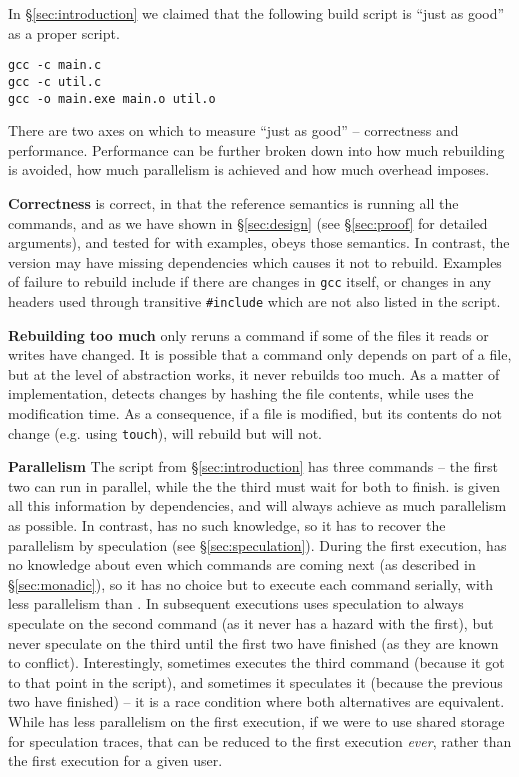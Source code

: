 In \S\ref{sec:introduction} we claimed that the following build script is ``just as good'' as a proper \Make script.

\begin{small}
\begin{verbatim}
gcc -c main.c
gcc -c util.c
gcc -o main.exe main.o util.o
\end{verbatim}
\end{small}

There are two axes on which to measure ``just as good'' -- correctness and performance. Performance can be further broken down into how much rebuilding is avoided, how much parallelism is achieved and how much overhead \Rattle imposes.

\textbf{Correctness} \Rattle is correct, in that the reference semantics is running all the commands, and as we have shown in \S\ref{sec:design} (see  \S\ref{sec:proof} for detailed arguments), and tested for with examples, \Rattle obeys those semantics. In contrast, the \Make version may have missing dependencies which causes it not to rebuild. Examples of failure to rebuild include if there are changes in \texttt{gcc} itself, or changes in any headers used through transitive \texttt{\#include} which are not also listed in the \Make script.

\textbf{Rebuilding too much} \Rattle only reruns a command if some of the files it reads or writes have changed. It is possible that a command only depends on part of a file, but at the level of abstraction \Rattle works, it never rebuilds too much. As a matter of implementation, \Rattle detects changes by hashing the file contents, while \Make uses the modification time. As a consequence, if a file is modified, but its contents do not change (e.g. using \texttt{touch}), \Make will rebuild but \Rattle will not.

\textbf{Parallelism} The script from \S\ref{sec:introduction} has three commands -- the first two can run in parallel, while the the third must wait for both to finish. \Make is given all this information by dependencies, and will always achieve as much parallelism as possible. In contrast, \Rattle has no such knowledge, so it has to recover the parallelism by speculation (see \S\ref{sec:speculation}). During the first execution, \Rattle has no knowledge about even which commands are coming next (as described in \S\ref{sec:monadic}), so it has no choice but to execute each command serially, with less parallelism than \Make. In subsequent executions \Rattle uses speculation to always speculate on the second command (as it never has a hazard with the first), but never speculate on the third until the first two have finished (as they are known to conflict). Interestingly, sometimes \Rattle executes the third command (because it got to that point in the script), and sometimes it speculates it (because the previous two have finished) -- it is a race condition where both alternatives are equivalent. While \Rattle has less parallelism on the first execution, if we were to use shared storage for speculation traces, that can be reduced to the first execution \emph{ever}, rather than the first execution for a given user.

